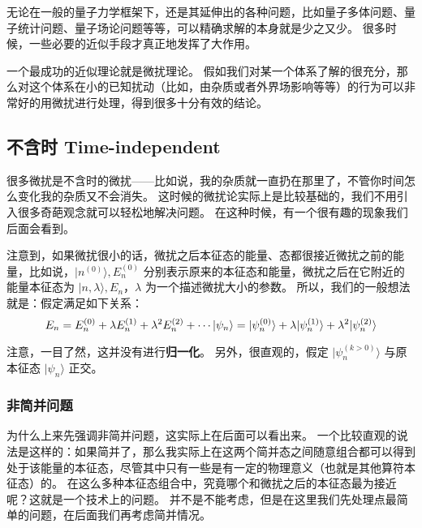 
\begin{issues}
\issueMissDepend
\end{issues}

无论在一般的量子力学框架下，还是其延伸出的各种问题，比如量子多体问题、量子统计问题、量子场论问题等等，可以精确求解的本身就是少之又少。 很多时候，一些必要的近似手段才真正地发挥了大作用。

一个最成功的近似理论就是微扰理论。 假如我们对某一个体系了解的很充分，那么对这个体系在小的已知扰动（比如，由杂质或者外界场影响等等）的行为可以非常好的用微扰进行处理，得到很多十分有效的结论。

\subsection{不含时 Time-independent}

很多微扰是不含时的微扰——比如说，我的杂质就一直扔在那里了，不管你时间怎么变化我的杂质又不会消失。 这时候的微扰论实际上是比较基础的，我们不用引入很多奇葩观念就可以轻松地解决问题。 在这种时候，有一个很有趣的现象我们后面会看到。

注意到，如果微扰很小的话，微扰之后本征态的能量、态都很接近微扰之前的能量，比如说，$|n^{(0)}\rangle, E_n^{(0)}$ 分别表示原来的本征态和能量，微扰之后在它附近的能量本征态为 $|n,\lambda\rangle, E_n$，$\lambda$ 为一个描述微扰大小的参数。 所以，我们的一般想法就是：假定满足如下关系：
\begin{equation}
E_n = E_n^{(0)} + \lambda E_n^{(1)} + \lambda^2 E_n^{(2)} + \cdots\\
|\psi_n\rangle = |\psi_n^{(0)}\rangle + \lambda|\psi_n^{(1)}\rangle + \lambda^2 |\psi_n^{(2)}\rangle
\end{equation}

注意，一目了然，这并没有进行\textbf{归一化}。 另外，很直观的，假定 $|\psi_n^{(k>0)}\rangle$ 与原本征态 $|\psi_n\rangle$ 正交。

\subsubsection{非简并问题}

为什么上来先强调非简并问题，这实际上在后面可以看出来。 一个比较直观的说法是这样的：如果简并了，那么我实际上在这两个简并态之间随意组合都可以得到处于该能量的本征态，尽管其中只有一些是有一定的物理意义（也就是其他算符本征态）的。 在这么多种本征态组合中，究竟哪个和微扰之后的本征态最为接近呢？这就是一个技术上的问题。 并不是不能考虑，但是在这里我们先处理点最简单的问题，在后面我们再考虑简并情况。

